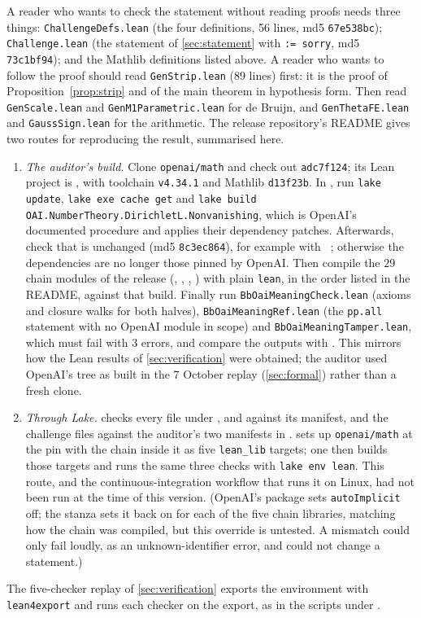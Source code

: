\documentclass[11pt]{article}
\theoremstyle{definition}
\newcommand{\lean}[1]{\texttt{#1}}
\begin{document}
A reader who wants to check the statement without reading proofs needs three things: \lean{ChallengeDefs.lean} (the four definitions, 56 lines, md5 \lean{67e538bc}); \lean{Challenge.lean} (the statement of \cref{sec:statement} with \lean{:= sorry}, md5 \lean{73c1bf94}); and the Mathlib definitions listed above. A reader who wants to follow the proof should read \lean{GenStrip.lean} (89 lines) first: it is the proof of Proposition~\ref{prop:strip} and of the main theorem in hypothesis form. Then read \lean{GenScale.lean} and \lean{GenM1Parametric.lean} for de Bruijn, and \lean{GenThetaFE.lean} and \lean{GaussSign.lean} for the arithmetic. The release repository's README gives two routes for reproducing the result, summarised here.
\begin{enumerate}
\item \emph{The auditor's build.} Clone \lean{openai/\allowbreak{}math} and check out \lean{adc7f124}; its Lean project is , with toolchain \lean{v4.34.1} and Mathlib \lean{d13f23b}. In , run \lean{lake update}, \lean{lake exe cache get} and \lean{lake build OAI.NumberTheory.DirichletL.Nonvanishing}, which is OpenAI's documented procedure and applies their dependency patches. Afterwards, check that  is unchanged (md5 \lean{8c3ec864}), for example with ~; otherwise the dependencies are no longer those pinned by OpenAI. Then compile the $29$ chain modules of the release (, , , ) with plain \lean{lean}, in the order listed in the README, against that build. Finally run \lean{BbOaiMeaningCheck.lean} (axioms and closure walks for both halves), \lean{BbOaiMeaningRef.lean} (the \lean{pp.all} statement with no OpenAI module in scope) and \lean{BbOaiMeaningTamper.lean}, which must fail with $3$ errors, and compare the outputs with . This mirrors how the Lean results of \cref{sec:verification} were obtained; the auditor used OpenAI's tree as built in the 7 October replay (\cref{sec:formal}) rather than a fresh clone.
\item \emph{Through Lake.}  checks every file under ,  and  against its manifest, and the challenge files against the auditor's two manifests in .  sets up \lean{openai/\allowbreak{}math} at the pin with the chain inside it as five \lean{lean\_lib} targets; one then builds those targets and runs the same three checks with \lean{lake env lean}. This route, and the continuous-integration workflow that runs it on Linux, had not been run at the time of this version. (OpenAI's package sets \lean{autoImplicit} off; the stanza sets it back on for each of the five chain libraries, matching how the chain was compiled, but this override is untested. A mismatch could only fail loudly, as an unknown-identifier error, and could not change a statement.)
\end{enumerate}
The five-checker replay of \cref{sec:verification} exports the environment with \lean{lean4export} and runs each checker on the export, as in the scripts under .
\end{document}
